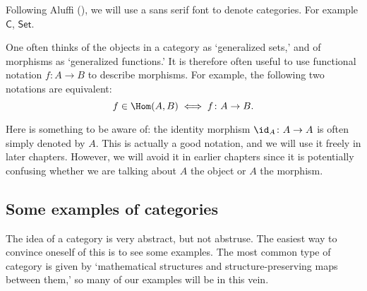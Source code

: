 \documentclass[notes.tex]{subfiles}
\begin{document}
\begin{notation}
  Following Aluffi (\cite{aluffi-algebra-chapter-0}), we will use a sans serif font to denote categories. For example $\mathsf{C}$, $\mathsf{Set}$.
\end{notation}

One often thinks of the objects in a category as `generalized sets,' and of morphisms as `generalized functions.' It is therefore often useful to use functional notation $f\colon A \to B$ to describe morphisms. For example, the following two notations are equivalent:
\begin{equation*}
  f \in \Hom(A, B) \iff f\colon A \to B.
\end{equation*}

Here is something to be aware of: the identity morphism $\id_{A}\colon A \to A$ is often simply denoted by $A$. This is actually a good notation, and we will use it freely in later chapters. However, we will avoid it in earlier chapters since it is potentially confusing whether we are talking about $A$ the object or $A$ the morphism.


\subsection{Some examples of categories}\label{sse:examples_of_categories}

The idea of a category is very abstract, but not abstruse. The easiest way to convince oneself of this is to see some examples. The most common type of category is given by `mathematical structures and structure-preserving maps between them,' so many of our examples will be in this vein.
\end{document}
